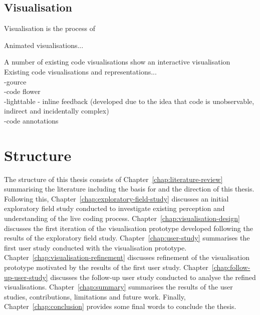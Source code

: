 \subsection{Visualisation}

Visualisation is the process of 

Animated visualisations...

A number of existing code visualisations show an interactive visualisation Existing code visualisations and representations...\\
-gource~\cite{Caudwell2010}\\
-code flower\\
-lighttable - inline feedback (developed due to the idea that code is unobservable, indirect and incidentally complex) \\
-code annotations~\cite{Swift2013}

\section{Structure}

The structure of this thesis consists of Chapter~\ref{chap:literature-review} summarising the literature including the basis for and the direction of this thesis. Following this, Chapter~\ref{chap:exploratory-field-study} discusses an initial exploratory field study conducted to investigate existing perception and understanding of the live coding process. Chapter~\ref{chap:visualisation-design} discusses the first iteration of the visualisation prototype developed following the results of the exploratory field study. Chapter~\ref{chap:user-study} summarises the first user study conducted with the visualisation prototype. Chapter~\ref{chap:visualisation-refinement} discusses refinement of the visualisation prototype motivated by the results of the first user study. Chapter~\ref{chap:follow-up-user-study} discusses the follow-up user study conducted to analyse the refined visualisations. Chapter~\ref{chap:summary} summarises the results of the user studies, contributions, limitations and future work. Finally, Chapter~\ref{chap:conclusion} provides some final words to conclude the thesis.





